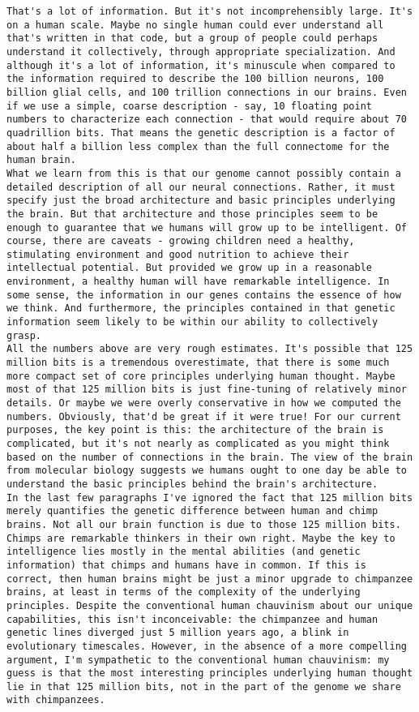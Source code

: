 \begin{lstlisting}
That's a lot of information. But it's not incomprehensibly large. It's on a human scale. Maybe no single human could ever understand all that's written in that code, but a group of people could perhaps understand it collectively, through appropriate specialization. And although it's a lot of information, it's minuscule when compared to the information required to describe the 100 billion neurons, 100 billion glial cells, and 100 trillion connections in our brains. Even if we use a simple, coarse description - say, 10 floating point numbers to characterize each connection - that would require about 70 quadrillion bits. That means the genetic description is a factor of about half a billion less complex than the full connectome for the human brain.
What we learn from this is that our genome cannot possibly contain a detailed description of all our neural connections. Rather, it must specify just the broad architecture and basic principles underlying the brain. But that architecture and those principles seem to be enough to guarantee that we humans will grow up to be intelligent. Of course, there are caveats - growing children need a healthy, stimulating environment and good nutrition to achieve their intellectual potential. But provided we grow up in a reasonable environment, a healthy human will have remarkable intelligence. In some sense, the information in our genes contains the essence of how we think. And furthermore, the principles contained in that genetic information seem likely to be within our ability to collectively grasp.
All the numbers above are very rough estimates. It's possible that 125 million bits is a tremendous overestimate, that there is some much more compact set of core principles underlying human thought. Maybe most of that 125 million bits is just fine-tuning of relatively minor details. Or maybe we were overly conservative in how we computed the numbers. Obviously, that'd be great if it were true! For our current purposes, the key point is this: the architecture of the brain is complicated, but it's not nearly as complicated as you might think based on the number of connections in the brain. The view of the brain from molecular biology suggests we humans ought to one day be able to understand the basic principles behind the brain's architecture.
In the last few paragraphs I've ignored the fact that 125 million bits merely quantifies the genetic difference between human and chimp brains. Not all our brain function is due to those 125 million bits. Chimps are remarkable thinkers in their own right. Maybe the key to intelligence lies mostly in the mental abilities (and genetic information) that chimps and humans have in common. If this is correct, then human brains might be just a minor upgrade to chimpanzee brains, at least in terms of the complexity of the underlying principles. Despite the conventional human chauvinism about our unique capabilities, this isn't inconceivable: the chimpanzee and human genetic lines diverged just 5 million years ago, a blink in evolutionary timescales. However, in the absence of a more compelling argument, I'm sympathetic to the conventional human chauvinism: my guess is that the most interesting principles underlying human thought lie in that 125 million bits, not in the part of the genome we share with chimpanzees.

\end{lstlisting}
